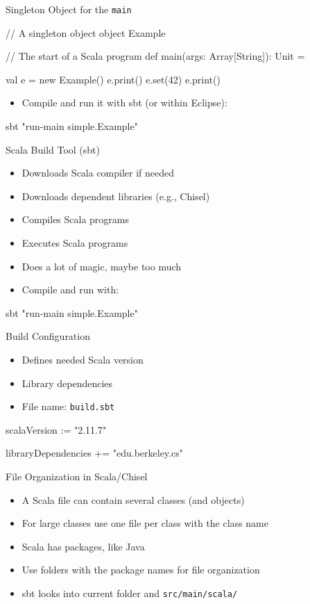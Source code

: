 \documentclass[xcolor=pdflatex,dvipsnames,table]{beamer}
\newcommand{\code}[1]{{\texttt{#1}}}
\begin{document}
\begin{frame}[fragile]{Singleton Object for the \code{main}}
\begin{chisel}
// A singleton object
object Example {
  
  // The start of a Scala program
  def main(args: Array[String]): Unit = {
    
    val e = new Example()
    e.print()
    e.set(42)
    e.print()
  }
}
\end{chisel}
\begin{itemize}
\item Compile and run it with sbt (or within Eclipse):
\end{itemize}
\begin{chisel}
sbt "run-main simple.Example"
\end{chisel}
\end{frame}

\begin{frame}[fragile]{Scala Build Tool (sbt)}
\begin{itemize}
\item Downloads Scala compiler if needed
\item Downloads dependent libraries (e.g., Chisel)
\item Compiles Scala programs
\item Executes Scala programs
\item Does a lot of magic, maybe too much
\item Compile and run with:
\end{itemize}
\begin{chisel}
sbt "run-main simple.Example"
\end{chisel}
\end{frame}

\begin{frame}[fragile]{Build Configuration}
\begin{itemize}
\item Defines needed Scala version
\item Library dependencies
\item File name: \code{build.sbt}
\end{itemize}
\begin{chisel}
scalaVersion := "2.11.7"

libraryDependencies += "edu.berkeley.cs" %
\end{chisel}
\end{frame}

\begin{frame}[fragile]{File Organization in Scala/Chisel}
\begin{itemize}
\item A Scala file can contain several classes (and objects)
\item For large classes use one file per class with the class name
\item Scala has packages, like Java
\item Use folders with the package names for file organization
\item sbt looks into current folder and \code{src/main/scala/}
\end{itemize}
\end{frame}
\end{document}
